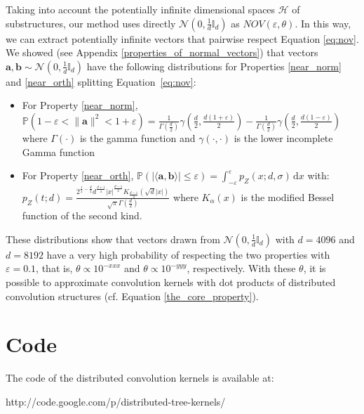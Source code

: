 \documentclass[twoside,11pt]{article}
\def\vec#1{\mathbf{#1}}
\def\dotprod#1#2{\langle#1,#2\rangle}
\newcounter{properties}
\begin{document}
Taking into account the potentially infinite dimensional spaces $\mathcal H$ of substructures, our method uses directly $\mathcal{N}(0,\frac{1}{d}\mathbb{I}_d)$ as $NOV(\varepsilon,\theta)$. In this way, we can extract potentially infinite vectors that pairwise respect Equation \ref{eq:nov}. We showed (see Appendix \ref{properties_of_normal_vectors}) that vectors $\vec a, \vec b \sim \mathcal{N}(0,\frac{1}{d}\mathbb{I}_d)$ have the following distributions for Properties \ref{near_norm} and \ref{near_orth} splitting Equation~\ref{eq:nov}:
\begin{itemize}
\item[]  For Property \ref{near_norm},
$\mathbb{P}(1-\varepsilon<\|\vec{a}\|^{2}<1+\varepsilon) = \frac{1}{\Gamma\left(\frac{d}{2}\right)}\gamma\left(\frac{d}{2},\frac{d(1+\varepsilon)}{2}\right) - \frac{1}{\Gamma\left(\frac{d}{2}\right)}\gamma\left(\frac{d}{2},\frac{d(1-\varepsilon)}{2}\right)$
where $\Gamma(\cdot)$ is the gamma function and $\gamma(\cdot,\cdot)$ is the lower incomplete Gamma function \cite{gammafunction}
\item[] For Property \ref{near_orth},
$\mathbb{P}(\vert \dotprod{\vec a}{\vec b}\vert\leq\varepsilon)=\int_{-\varepsilon}^{\varepsilon}p_{Z}\left(x;d,\sigma\right)\,\text{d}x$
with:
$
p_Z(t;d)=\frac{2^{\frac{1}{2}-\frac{d}{2}} d^{\frac{d+1}{4}} \left| x\right| ^{\frac{d-1}{2}} K_{\frac{d-1}{2}}\left(\sqrt{d} \left| x\right| \right)}{\sqrt{\pi } \Gamma \left(\frac{d}{2}\right)}
$
where $K_{\alpha}(x)$ is the modified Bessel function of the second kind.  
\end{itemize}
These distributions show that vectors drawn from $\mathcal{N}(0,\frac{1}{d}\mathbb{I}_d)$ with $d=4096$ and $d=8192$ have a very high probability of respecting the two properties with $\varepsilon=0.1$, that is, $\theta \propto 10^{-xxx}$ and $\theta \propto 10^{-yyy}$, respectively. With these $\theta$, it is possible to approximate convolution kernels with dot products of distributed convolution structures (cf. Equation \ref{the_core_property}). 



\section{Code}

The code of the distributed convolution kernels is available at:
\begin{center}
http://code.google.com/p/distributed-tree-kernels/
\end{center}





\end{document}

